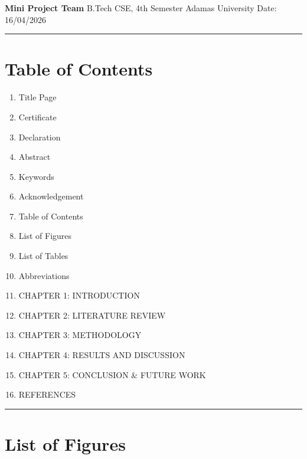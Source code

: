 \documentclass[
]{article}
\providecommand{\tightlist}{%
  \setlength{\itemsep}{0pt}\setlength{\parskip}{0pt}}
\begin{document}
\textbf{Mini Project Team} B.Tech CSE, 4th Semester Adamas University
Date: 16/04/2026

\begin{center}\rule{0.5\linewidth}{0.5pt}\end{center}

\section{Table of Contents}\label{table-of-contents}

\begin{enumerate}
\def\labelenumi{\arabic{enumi}.}
\tightlist
\item
  Title Page
\item
  Certificate
\item
  Declaration
\item
  Abstract
\item
  Keywords
\item
  Acknowledgement
\item
  Table of Contents
\item
  List of Figures
\item
  List of Tables
\item
  Abbreviations
\item
  CHAPTER 1: INTRODUCTION
\item
  CHAPTER 2: LITERATURE REVIEW
\item
  CHAPTER 3: METHODOLOGY
\item
  CHAPTER 4: RESULTS AND DISCUSSION
\item
  CHAPTER 5: CONCLUSION \& FUTURE WORK
\item
  REFERENCES
\end{enumerate}

\begin{center}\rule{0.5\linewidth}{0.5pt}\end{center}

\section{List of Figures}\label{list-of-figures}
\end{document}
